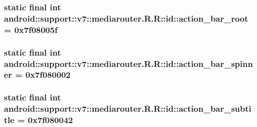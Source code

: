 \hypertarget{classandroid_1_1support_1_1v7_1_1mediarouter_1_1_r_1_1id_7c3fba35bee9af30bbf328b3f3a36284}{
\subsubsection[{action\_\-bar\_\-root}]{\setlength{\rightskip}{0pt plus 5cm}static final int android::support::v7::mediarouter.R.R::id::action\_\-bar\_\-root = 0x7f08005f}}
\label{classandroid_1_1support_1_1v7_1_1mediarouter_1_1_r_1_1id_7c3fba35bee9af30bbf328b3f3a36284}


\hypertarget{classandroid_1_1support_1_1v7_1_1mediarouter_1_1_r_1_1id_7599b85a5664d76e0239f30d119aea62}{
\subsubsection[{action\_\-bar\_\-spinner}]{\setlength{\rightskip}{0pt plus 5cm}static final int android::support::v7::mediarouter.R.R::id::action\_\-bar\_\-spinner = 0x7f080002}}
\label{classandroid_1_1support_1_1v7_1_1mediarouter_1_1_r_1_1id_7599b85a5664d76e0239f30d119aea62}


\hypertarget{classandroid_1_1support_1_1v7_1_1mediarouter_1_1_r_1_1id_f4db243b7a996feea8ef50492fb4905c}{
\subsubsection[{action\_\-bar\_\-subtitle}]{\setlength{\rightskip}{0pt plus 5cm}static final int android::support::v7::mediarouter.R.R::id::action\_\-bar\_\-subtitle = 0x7f080042}}
\label{classandroid_1_1support_1_1v7_1_1mediarouter_1_1_r_1_1id_f4db243b7a996feea8ef50492fb4905c}


